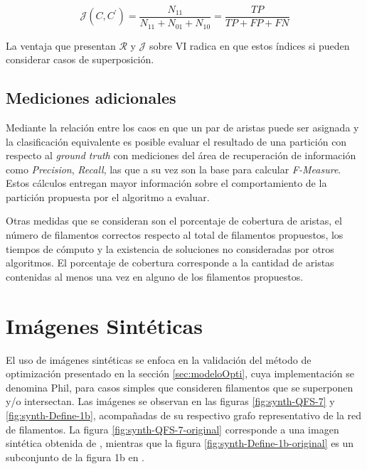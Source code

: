 \begin{equation}
\mathcal{J}(C,C^{\prime}) = \frac{N_{11}}{N_{11} + N_{01} + N_{10}} = \frac{TP}{TP + FP + FN}
\label{eq:JaccardIndex}
\end{equation}

La ventaja que presentan $\mathcal{R}$ y $\mathcal{J}$ sobre VI radica en que estos \'indices si pueden considerar casos de superposici\'on.

\subsection{Mediciones adicionales}

Mediante la relaci\'on entre los caos en que un par de aristas puede ser asignada y la clasificaci\'on equivalente es posible evaluar el resultado de una partici\'on con respecto al {\it ground truth} con mediciones del \'area de recuperaci\'on de informaci\'on como {\it Precision}, {\it Recall}, las que a su vez son la base para calcular {\it F-Measure}.
Estos c\'alculos entregan mayor informaci\'on sobre el comportamiento de la partici\'on propuesta por el algoritmo a evaluar. 


Otras medidas que se consideran son el porcentaje de cobertura de aristas, el n\'umero de filamentos correctos respecto al total de filamentos propuestos, los tiempos de c\'omputo y la existencia de soluciones no consideradas por otros algoritmos. El porcentaje de cobertura corresponde a la cantidad de aristas contenidas al menos una vez en alguno de los filamentos propuestos.

\section{Im\'agenes Sint\'eticas}

El uso de im\'agenes sint\'eticas se enfoca en la validaci\'on del m\'etodo de optimizaci\'on presentado en la secci\'on \ref{sec:modeloOpti}, cuya implementaci\'on se denomina {\sc Phil}, para casos simples que consideren filamentos que se superponen y/o intersectan. Las im\'agenes se observan en las figuras \ref{fig:synth-QFS-7} y \ref{fig:synth-Define-1b}, acompa\~nadas de su respectivo grafo representativo de la red de filamentos. La figura \ref{fig:synth-QFS-7-original} corresponde a una imagen sint\'etica obtenida de \cite{qiu2014quantitative}, mientras que la figura \ref{fig:synth-Define-1b-original} es un subconjunto de la figura 1b  en \cite{breuer2015define}.

